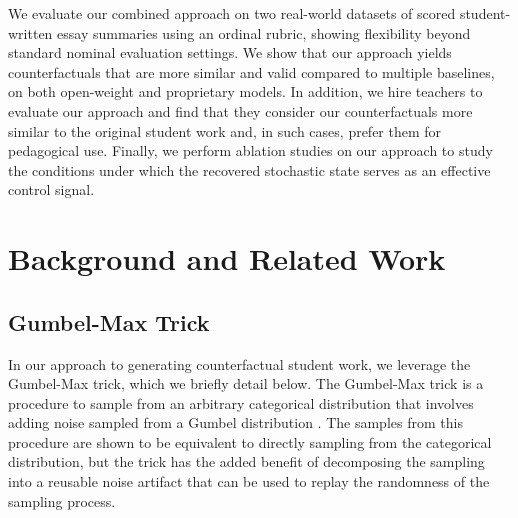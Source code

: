 \documentclass[letterpaper]{article} %
\newcommand{\ml}[1]{\textcolor{orange}{\bf [lan: #1]}}
\begin{document}
We evaluate our combined approach on two real-world datasets of scored student-written essay summaries using an ordinal rubric, showing flexibility beyond standard nominal evaluation settings. We show that our approach yields counterfactuals that are more similar and valid compared to multiple baselines, on both open-weight and proprietary models.
In addition, we hire teachers to evaluate our approach and find that they consider our counterfactuals more similar to the original student work and, in such cases, prefer them for pedagogical use. 
Finally, we perform ablation studies on our approach to study the conditions under which the recovered stochastic state serves as an effective control signal.



\section{Background and Related Work}
\subsection{Gumbel-Max Trick}\label{sec:trick}

In our approach to generating counterfactual student work, we leverage the Gumbel-Max trick, which we briefly detail below. The Gumbel-Max trick is a procedure to sample from an arbitrary categorical distribution that involves adding noise sampled from a Gumbel distribution \cite{Maddison2014AS}. The samples from this procedure are shown to be equivalent to directly sampling from the categorical distribution, but the trick has the added benefit of decomposing the sampling into a reusable noise artifact that can be used to replay the randomness of the sampling process. 
\end{document}
